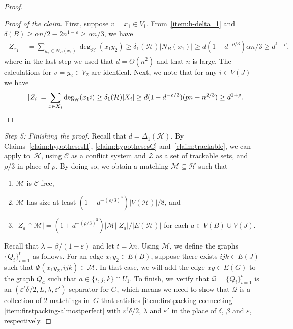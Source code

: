 \documentclass[a4paper, 11pt,reqno]{amsart}
\newcommand{\calH}{\mathcal{H}}
\newcommand{\calQ}{\mathcal{Q}}
\theoremstyle{plain}
\theoremstyle{definition}
\numberwithin{equation}{section}
\newcommand{\eps}{\varepsilon}
\newenvironment{proofclaim}[1][Proof of the claim]{\begin{proof}[#1]\renewcommand*{\qedsymbol}{\(\square\)}}{\end{proof}}
\renewcommand*{\qedsymbol}{\(\blacksquare\)}
\begin{document}
\begin{proof}
\begin{proofclaim}
	First, suppose $v = x_1 \in V_1$.  From~\ref{item:h-delta_1} and 
	$\delta(B) \geq \alpha n/2 - 2n^{1 - \rho} \geq \alpha n/3$, we have
	\begin{align*}
		|Z_{x_1}| & = \sum_{y_2 \in N_B(x_1)} \deg_{\mathcal{H}}(x_1 y_2)
		\geq \delta_1(\mathcal{H}) |N_B(x_1)|
		\geq d(1-d^{-\rho/3}) \alpha n / 3 \geq d^{1+\rho},
	\end{align*}
	where in the last step we used that $d = \Theta(n^2)$ and that $n$ is large.  
	The calculations for $v = y_2 \in V_2$ are identical. 
	Next, we note that for any $i\in V(J)$ we have
	\begin{align*}
		\qquad |Z_{i}| & = \sum_{x \in X_i} \deg_{\mathcal{H}}(x_1 i)
		\geq \delta_1(\mathcal{H}) |X_i|
		\geq d(1-d^{-\rho/3})(pn-n^{2/3})
		\geq d^{1+\rho}. \qedhere
	\end{align*}
\end{proofclaim}

\medskip

\noindent \emph{Step 5: Finishing the proof.}
Recall that $d=\Delta_1(\calH)$. By Claims~\ref{claim:hypothesesH},
\ref{claim:hypothesesC} and~\ref{claim:trackable}, we can apply
 to~$\mathcal{H}$, using
$\mathcal{C}$ as a conflict system and $\mathcal{Z}$ as a set of
trackable sets, and $\rho/3$ in place of $\rho$. By doing so, we obtain a matching
$\mathcal{M} \subseteq \mathcal{H}$ such that
\begin{enumerate}
	\item $\mathcal{M}$ is $\mathcal{C}$-free,
	\item \label{item:matching-size}$\mathcal{M}$ has size at least $(1
	- d^{- (\rho/3)^3})|V(\mathcal{H})|/8$, and
	\item \label{item:matching-Zz}$|Z_{a} \cap \mathcal{M}| = (1 \pm d^{-
		(\rho/3)^3})|\mathcal{M}||Z_a|/|E(\mathcal{H})|$ for each $a
	\in V(B)\cup V(J)$.
\end{enumerate}

Recall that $\lambda = \beta/(1-\eps)$ and let $t = \lambda n$.
Using $\mathcal{M}$, we define the graphs $\{ Q_i \}_{i=1}^t$ as follows.  
For an edge $x_1 y_2 \in E(B)$, suppose there exists $ijk \in E(J)$ 
such that $\Phi(x_1 y_2, ijk) \in \mathcal{M}$.  
In that case, we will add the edge $xy \in E(G)$ to the graph $Q_a$ 
such that $a \in \{i, j, k \} \cap U_1$.  
To finish, we verify that $\calQ = \{Q_i\}_{i=1}^t$ is an $(\eps^\ell\delta/2, L, \lambda, \eps')$-separator for $G$,
which means we need to show that $\calQ$ is a collection of $2$-matchings in~$G$ that satisfies \ref{item:firstpacking-connecting}--\ref{item:firstpacking-almostperfect} with $\eps^\ell\delta/2$, $\lambda$ and $\eps'$ in the place of $\delta$, $\beta$ and $\eps$, respectively.


\end{proof}
\end{document}
